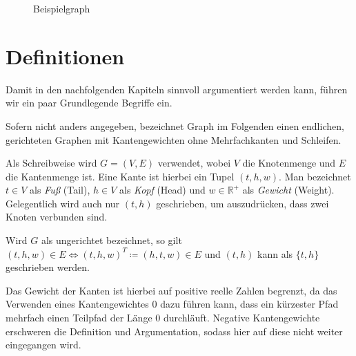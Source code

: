 \begin{figure}[ht]
    \caption{Beispielgraph}
    \label{graphs:fig:beispielgraph}
\end{figure}

\section{Definitionen}
Damit in den nachfolgenden Kapiteln sinnvoll argumentiert werden kann, führen wir ein paar Grundlegende Begriffe ein.

\begin{definition}[Graph]
    Sofern nicht anders angegeben, bezeichnet Graph im Folgenden einen endlichen, gerichteten Graphen mit Kantengewichten ohne Mehrfachkanten und Schleifen.

    Als Schreibweise wird $G = (V, E)$ verwendet, wobei $V$ die Knotenmenge und $E$ die Kantenmenge ist. Eine Kante ist hierbei ein Tupel $(t, h, w)$. Man bezeichnet $t \in V$ als \emph{Fuß} (Tail), $h \in V$ als \emph{Kopf} (Head) und $w \in \mathbb{R}^+$ als \emph{Gewicht} (Weight). Gelegentlich wird auch nur $(t, h)$ geschrieben, um auszudrücken, dass zwei Knoten verbunden sind.

    Wird $G$ als ungerichtet bezeichnet, so gilt $(t, h, w) \in E \Leftrightarrow (t, h, w)^T \coloneq (h, t, w) \in E$ und $(t, h)$ kann als $\{ t, h \}$ geschrieben werden.
\end{definition}

Das Gewicht der Kanten ist hierbei auf positive reelle Zahlen begrenzt, da das Verwenden eines Kantengewichtes $0$ dazu führen kann, dass ein kürzester Pfad mehrfach einen Teilpfad der Länge 0 durchläuft.
Negative Kantengewichte erschweren die Definition und Argumentation, sodass hier auf diese nicht weiter eingegangen wird.

